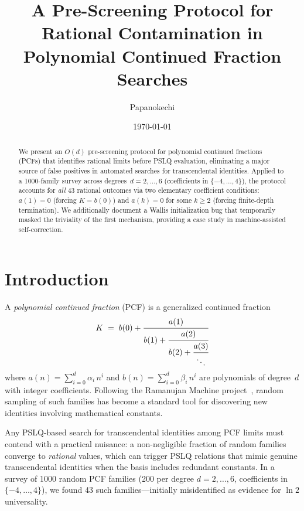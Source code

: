 \documentclass[11pt]{amsart}
\title[Rational Contamination in PCF Searches]{A Pre-Screening Protocol for Rational Contamination
  in Polynomial Continued Fraction Searches}
\author{Papanokechi}
\date{\today}
\theoremstyle{definition}
\theoremstyle{remark}
\begin{document}
\begin{abstract}
We present an $O(d)$ pre-screening protocol for polynomial continued
fractions (PCFs) that identifies rational limits before PSLQ
evaluation, eliminating a major source of false positives in
automated searches for transcendental identities.
Applied to a 1000-family survey across degrees~$d=2,\ldots,6$
(coefficients in $\{-4,\ldots,4\}$), the protocol accounts for
\emph{all} 43 rational outcomes via two elementary coefficient
conditions: $a(1)=0$ (forcing $K=b(0)$) and $a(k)=0$ for some
$k\ge 2$ (forcing finite-depth termination).
We additionally document a Wallis initialization bug that temporarily
masked the triviality of the first mechanism, providing a case study
in machine-assisted self-correction.
\end{abstract}

\maketitle

\section{Introduction}\label{sec:intro}

A \emph{polynomial continued fraction} (PCF) is a generalized continued
fraction
\begin{equation}\label{eq:pcf}
  K \;=\; b(0) + \cfrac{a(1)}{b(1) + \cfrac{a(2)}{b(2) + \cfrac{a(3)}{\ddots}}}
\end{equation}
where $a(n) = \sum_{i=0}^{d} \alpha_i\, n^i$ and
$b(n) = \sum_{i=0}^{d} \beta_i\, n^i$
are polynomials of degree~$d$ with integer coefficients.
Following the Ramanujan Machine project~\cite{raayoni2021}, random sampling of
such families has become a standard tool for discovering new identities
involving mathematical constants.

Any PSLQ-based search for transcendental identities among PCF limits
must contend with a practical nuisance: a non-negligible fraction of
random families converge to \emph{rational} values, which can trigger
PSLQ relations that mimic genuine transcendental identities when the
basis includes redundant constants.
In a survey of 1000 random PCF families (200 per degree $d=2,\ldots,6$,
coefficients in $\{-4,\ldots,4\}$), we found 43 such families---initially
misidentified as evidence for $\ln 2$ universality.
\end{document}
